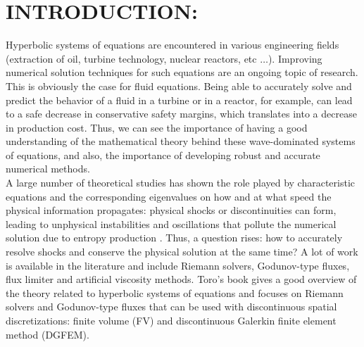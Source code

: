 %
%
%


\pagestyle{plain} %
\setcounter{page}{1}

\chapter{\uppercase {Introduction:}}
Hyperbolic systems of equations are encountered in various engineering fields (extraction of oil, turbine technology, nuclear reactors, etc $\dots$). Improving numerical solution techniques for such equations are an ongoing topic of research. This is obviously the case for fluid equations. Being able to accurately solve and predict the behavior of a fluid in a turbine or in a reactor, for example, can lead to a safe decrease in conservative safety margins, which translates into a decrease in production cost. Thus, we can see the importance of having a good understanding of the mathematical theory behind these wave-dominated systems of equations, and also, the importance of developing robust and accurate numerical methods.\\
A large number of theoretical studies has shown the role played by characteristic equations and the corresponding eigenvalues on how and at what speed the physical information propagates: physical shocks or discontinuities can form, leading to unphysical instabilities and oscillations that pollute the numerical solution due to entropy production \cite{Toro}. Thus, a question rises: how to accurately resolve shocks and conserve the physical solution at the same time? A lot of work is available in the literature and include Riemann solvers, Godunov-type fluxes, flux limiter and artificial viscosity methods. Toro's book \cite{Toro} gives a good overview of the theory related to hyperbolic systems of equations and focuses on Riemann solvers and Godunov-type fluxes that can be used with discontinuous spatial discretizations: finite volume (FV) and discontinuous Galerkin finite element method (DGFEM).
